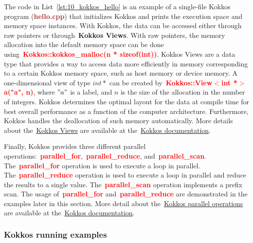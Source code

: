 \par
The code in List~\ref{lst:10_kokkos_hello} is an example of a single-file Kokkos program (\textbf{\textcolor{brown}{hello.cpp}}) that initializes Kokkos and prints the execution space and memory space instances.
With Kokkos, the data can be accessed either through raw pointers or through~\textbf{Kokkos Views}.
With raw pointers, the memory allocation into the default memory space can be done using~\textbf{\textcolor{red}{Kokkos::kokkos\_malloc(n * sizeof(int))}}.
Kokkos Views are a data type that provides a way to access data more efficiently in memory corresponding to a certain Kokkos memory space, such as host memory or device memory. 
A one-dimensional view of type $int *$ can be created by~\textbf{\textcolor{red}{Kokkos::View$<$int *$>$ a("a", n)}}, where $"a"$ is a label, and $n$ is the size of the allocation in the number of integers.
Kokkos determines the optimal layout for the data at compile time for best overall performance as a function of the computer architecture.
Furthermore, Kokkos handles the deallocation of such memory automatically.
More details about the~\href{https://kokkos.github.io/kokkos-core-wiki/ProgrammingGuide/View.html}{Kokkos Views} are available at the~\href{https://kokkos.github.io/kokkos-core-wiki/index.html}{Kokkos documentation}.


\par
Finally, Kokkos provides three different parallel operations:~\textbf{\textcolor{red}{parallel\_for}},~\textbf{\textcolor{red}{parallel\_reduce}}, and~\textbf{\textcolor{red}{parallel\_scan}}.
The~\textbf{\textcolor{red}{parallel\_for}} operation is used to execute a loop in parallel.
The~\textbf{\textcolor{red}{parallel\_reduce}} operation is used to execute a loop in parallel and reduce the results to a single value.
The~\textbf{\textcolor{red}{parallel\_scan}} operation implements a prefix scan.
The usage of~\textbf{\textcolor{red}{parallel\_for}} and~\textbf{\textcolor{red}{parallel\_reduce}} are demonstrated in the examples later in this section.
More detail about the~\href{https://kokkos.github.io/kokkos-core-wiki/ProgrammingGuide/ParallelDispatch.html}{Kokkos parallel operations} are available at the~\href{https://kokkos.github.io/kokkos-core-wiki/index.html}{Kokkos documentation}.


\subsubsection{Kokkos running examples}


